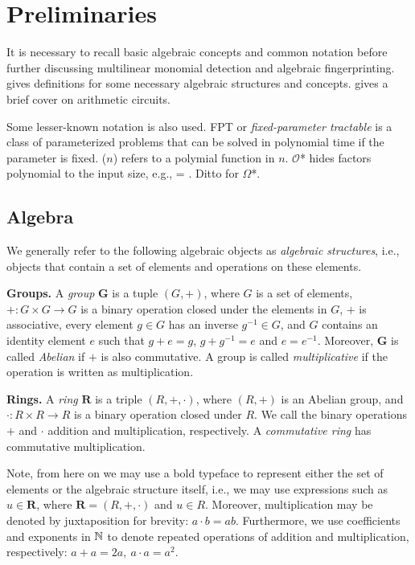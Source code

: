 \section{Preliminaries}
\label{sect:prelims}

It is necessary to recall basic algebraic concepts and common notation 
before further discussing multilinear monomial detection and algebraic fingerprinting. 
 gives definitions for some necessary algebraic structures 
and concepts.  gives a brief cover on arithmetic circuits. 

Some lesser-known notation is also used. FPT or \emph{fixed-parameter tractable} 
is a class of parameterized problems that 
can be solved in polynomial time if the parameter is fixed. 
\poly($n$) refers to a polymial function in $n$. 
$\mathcal O$* hides factors polynomial to the input size, e.g., 
 = . Ditto for $\Omega$*.

\subsection{Algebra} 
\label{sect:prelims_algebra}

We generally refer to the following algebraic objects 
as \emph{algebraic structures}, i.e., objects that contain a 
set of elements and operations on these elements.

\textbf{Groups.} A \emph{group} $\mathbf G$
is a tuple $(G, +)$, where $G$ is a set of elements, 
$+ \colon G \times G \to G$ 
is a binary operation closed under 
the elements in $G$, $+$ is associative, every element $g \in G$ 
has an inverse $g^{-1}\in G$, and $G$ contains 
an identity element $e$ such that $g + e = g$, $g + g^{-1} = e$ and $e = e^{-1}$. 
Moreover, $\mathbf G$ is called \emph{Abelian} if 
$+$ is also commutative. A group is called \emph{multiplicative} if the operation 
is written as multiplication.

\textbf{Rings.} A \emph{ring} $\mathbf R$ is a triple $(R,+,\cdot)$, 
where $(R, +)$ is an Abelian group, and $\cdot \colon R \times R \to R$ 
is a binary operation closed under $R$. We call the binary operations $+$ and $\cdot$ 
addition and multiplication, respectively. A \emph{commutative ring} has commutative multiplication. 

Note, from here on we may use a bold typeface to represent either the set of elements 
or the algebraic structure itself, i.e., 
we may use expressions such as $u \in \mathbf{R}$, where $\mathbf{R} = (R,+,\cdot)$ and $u \in R$. 
Moreover, multiplication may be denoted by juxtaposition for brevity: $a \cdot b = ab$. 
Furthermore, we use coefficients and exponents in $\mathbb N$ to denote repeated operations of 
addition and multiplication, respectively: $a+a = 2a, \: a \cdot a=a^2$.

